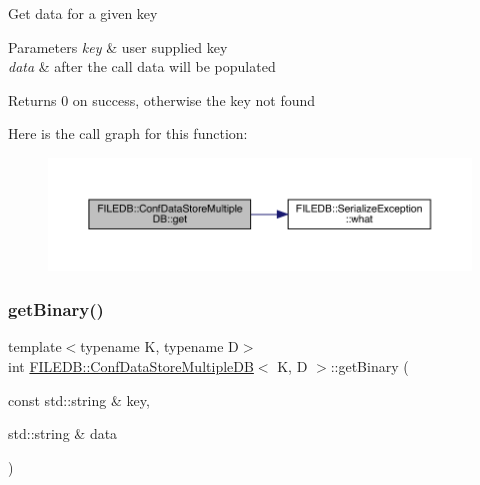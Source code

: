 Get data for a given key 
\begin{DoxyParams}{Parameters}
{\em key} & user supplied key \\
\hline
{\em data} & after the call data will be populated \\
\hline
\end{DoxyParams}
\begin{DoxyReturn}{Returns}
0 on success, otherwise the key not found 
\end{DoxyReturn}
Here is the call graph for this function\+:
\nopagebreak
\begin{figure}[H]
\begin{center}
\leavevmode
\includegraphics[width=350pt]{d3/dc0/classFILEDB_1_1ConfDataStoreMultipleDB_a15c985c05120d6076e890f0507ceade7_cgraph}
\end{center}
\end{figure}
\mbox{\label{classFILEDB_1_1ConfDataStoreMultipleDB_a56fefab208c1b4abc3139afb38035a13}} 
\subsubsection{\texorpdfstring{getBinary()}{getBinary()}\hspace{0.1cm}{\footnotesize\ttfamily [1/2]}}
{\footnotesize\ttfamily template$<$typename K, typename D$>$ \\
int \mbox{\hyperlink{classFILEDB_1_1ConfDataStoreMultipleDB}{F\+I\+L\+E\+D\+B\+::\+Conf\+Data\+Store\+Multiple\+DB}}$<$ K, D $>$\+::get\+Binary (\begin{DoxyParamCaption}\item[{const std\+::string \&}]{key,  }\item[{std\+::string \&}]{data }\end{DoxyParamCaption})\hspace{0.3cm}{\ttfamily [inline]}}

